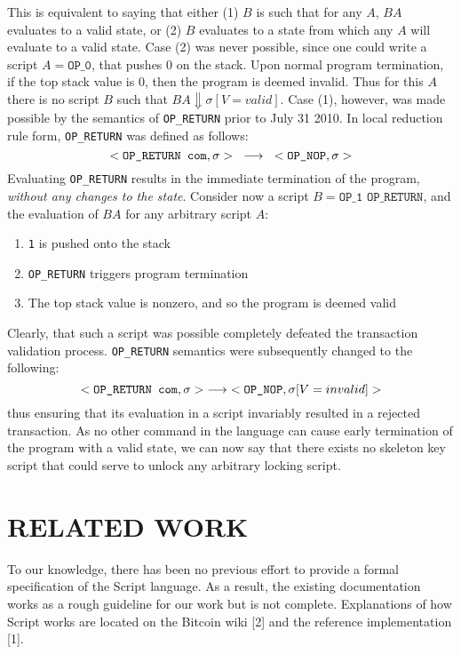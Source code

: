 \documentclass[letterpaper, 10 pt, conference]{ieeeconf}
\begin{document}
This is equivalent to saying that either (1) $B$ is such that for any $A$, $BA$ evaluates to a valid state, or (2) $B$ evaluates to a state from which any $A$ will evaluate to a valid state. Case (2) was never possible, since one could write a script $A = \texttt{OP\_0}$, that pushes 0 on the stack. Upon normal program termination, if the top stack value is 0, then the program is deemed invalid. Thus for this $A$ there is no script $B$ such that $BA \Downarrow \sigma[V=valid]$. Case (1), however, was made possible by the semantics of \texttt{OP\_RETURN} prior to July 31 2010. In local reduction rule form, \texttt{OP\_RETURN} was defined as follows:
%
$$<\texttt{OP\_RETURN com}, \sigma> \hspace{3mm} \longrightarrow \hspace{3mm} <\texttt{OP\_NOP}, \sigma>$$
%
Evaluating \texttt{OP\_RETURN} results in the immediate termination of the program, \textit{without any changes to the state}. Consider now a script $B = \texttt{OP\_1 OP\_RETURN}$, and the evaluation of $BA$ for any arbitrary script $A$:

\begin{enumerate}
  \item \texttt{1} is pushed onto the stack
  \item \texttt{OP\_RETURN} triggers program termination
  \item The top stack value is nonzero, and so the program is deemed valid
\end{enumerate}

Clearly, that such a script was possible completely defeated the transaction validation process. \texttt{OP\_RETURN} semantics were subsequently changed to the following:
%
$$<\texttt{OP\_RETURN com}, \sigma> \hspace{1mm} \longrightarrow \hspace{1mm} <\texttt{OP\_NOP}, \sigma[V=invalid]>$$
%
thus ensuring that its evaluation in a script invariably resulted in a rejected transaction.
As no other command in the language can cause early termination of the program with a valid state, we can now say that there exists no skeleton key script that could serve to unlock any arbitrary locking script.

\section{RELATED WORK}

To our knowledge, there has been no previous effort to provide a formal specification of the Script language. As a result, the existing documentation works as a rough guideline for our work but is not complete. Explanations of how Script works are located on the Bitcoin wiki [2] and the reference implementation [1].  
\end{document}
